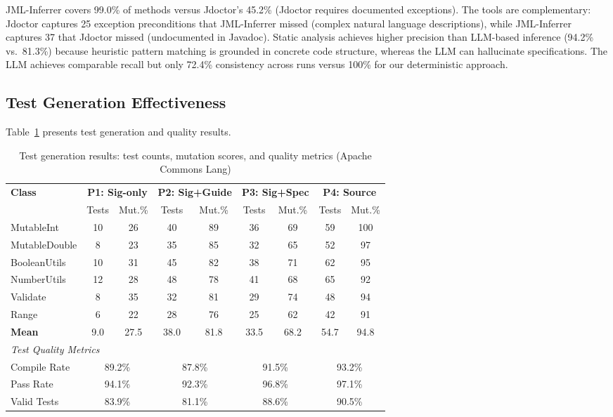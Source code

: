JML-Inferrer covers 99.0\% of methods versus Jdoctor's 45.2\% (Jdoctor requires documented exceptions). The tools are complementary: Jdoctor captures 25 exception preconditions that JML-Inferrer missed (complex natural language descriptions), while JML-Inferrer captures 37 that Jdoctor missed (undocumented in Javadoc). Static analysis achieves higher precision than LLM-based inference (94.2\% vs.\ 81.3\%) because heuristic pattern matching is grounded in concrete code structure, whereas the LLM can hallucinate specifications. The LLM achieves comparable recall but only 72.4\% consistency across runs versus 100\% for our deterministic approach.

\subsection{Test Generation Effectiveness}

Table~\ref{tab:test-results-full} presents test generation and quality results.

\begin{table}[t]
\centering
\caption{Test generation results: test counts, mutation scores, and quality metrics (Apache Commons Lang)}
\label{tab:test-results-full}
\small
\begin{tabular}{l|cc|cc|cc|cc}
\toprule
\multirow{2}{*}{\textbf{Class}} &
\multicolumn{2}{c|}{\textbf{P1: Sig-only}} &
\multicolumn{2}{c|}{\textbf{P2: Sig+Guide}} &
\multicolumn{2}{c|}{\textbf{P3: Sig+Spec}} &
\multicolumn{2}{c}{\textbf{P4: Source}} \\
\cline{2-9}
 & Tests & Mut.\% & Tests & Mut.\% & Tests & Mut.\% & Tests & Mut.\% \\
\midrule
MutableInt & 10 & 26 & 40 & 89 & 36 & 69 & 59 & 100 \\
MutableDouble & 8 & 23 & 35 & 85 & 32 & 65 & 52 & 97 \\
BooleanUtils & 10 & 31 & 45 & 82 & 38 & 71 & 62 & 95 \\
NumberUtils & 12 & 28 & 48 & 78 & 41 & 68 & 65 & 92 \\
Validate & 8 & 35 & 32 & 81 & 29 & 74 & 48 & 94 \\
Range & 6 & 22 & 28 & 76 & 25 & 62 & 42 & 91 \\
\midrule
\textbf{Mean} & 9.0 & 27.5 & 38.0 & 81.8 & 33.5 & 68.2 & 54.7 & 94.8 \\
\midrule
\multicolumn{9}{l}{\textit{Test Quality Metrics}} \\
\midrule
Compile Rate & \multicolumn{2}{c|}{89.2\%} & \multicolumn{2}{c|}{87.8\%} & \multicolumn{2}{c|}{91.5\%} & \multicolumn{2}{c}{93.2\%} \\
Pass Rate & \multicolumn{2}{c|}{94.1\%} & \multicolumn{2}{c|}{92.3\%} & \multicolumn{2}{c|}{96.8\%} & \multicolumn{2}{c}{97.1\%} \\
Valid Tests & \multicolumn{2}{c|}{83.9\%} & \multicolumn{2}{c|}{81.1\%} & \multicolumn{2}{c|}{88.6\%} & \multicolumn{2}{c}{90.5\%} \\
\bottomrule
\end{tabular}
\end{table}

